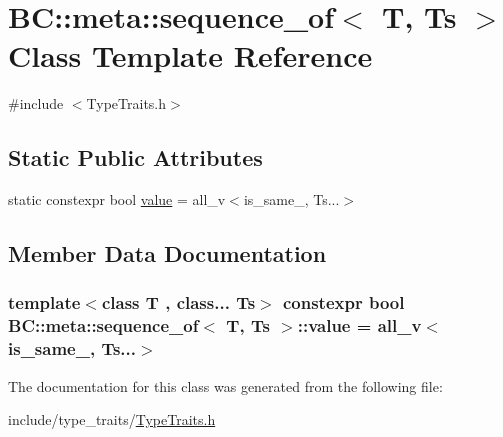 \hypertarget{classBC_1_1meta_1_1sequence__of}{}\section{BC\+:\+:meta\+:\+:sequence\+\_\+of$<$ T, Ts $>$ Class Template Reference}
\label{classBC_1_1meta_1_1sequence__of}


{\ttfamily \#include $<$Type\+Traits.\+h$>$}

\subsection*{Static Public Attributes}
\begin{DoxyCompactItemize}
\item 
static constexpr bool \hyperlink{classBC_1_1meta_1_1sequence__of_a800ae3cc8a2cab1d94a49426327762e3}{value} = all\+\_\+v$<$is\+\_\+same\+\_\+, Ts...$>$
\end{DoxyCompactItemize}


\subsection{Member Data Documentation}
\subsubsection[{\texorpdfstring{value}{value}}]{\setlength{\rightskip}{0pt plus 5cm}template$<$class T , class... Ts$>$ constexpr bool {\bf B\+C\+::meta\+::sequence\+\_\+of}$<$ T, Ts $>$\+::value = all\+\_\+v$<$is\+\_\+same\+\_\+, Ts...$>$\hspace{0.3cm}{\ttfamily [static]}}\hypertarget{classBC_1_1meta_1_1sequence__of_a800ae3cc8a2cab1d94a49426327762e3}{}\label{classBC_1_1meta_1_1sequence__of_a800ae3cc8a2cab1d94a49426327762e3}


The documentation for this class was generated from the following file\+:\begin{DoxyCompactItemize}
\item 
include/type\+\_\+traits/\hyperlink{TypeTraits_8h}{Type\+Traits.\+h}\end{DoxyCompactItemize}
